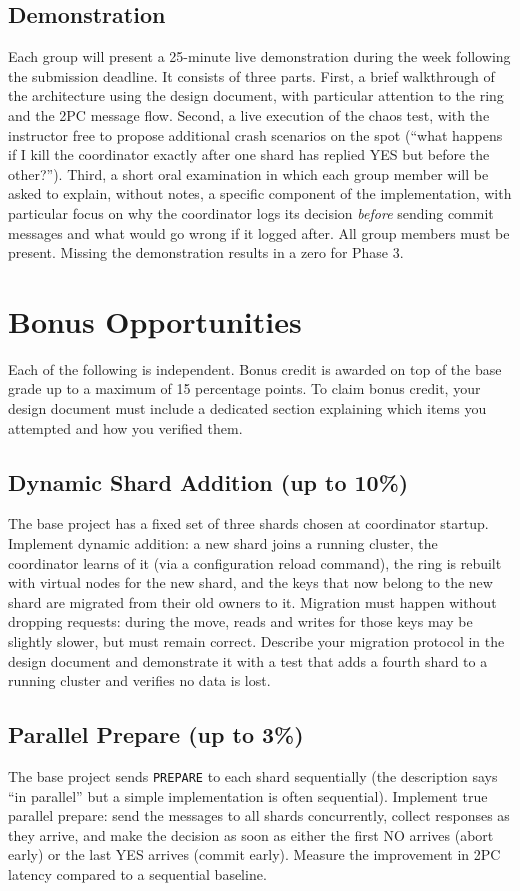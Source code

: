 \documentclass[11pt,a4paper]{article}
\begin{document}
\subsection{Demonstration}
Each group will present a 25-minute live demonstration during the week following the submission deadline. It consists of three parts. First, a brief walkthrough of the architecture using the design document, with particular attention to the ring and the 2PC message flow. Second, a live execution of the chaos test, with the instructor free to propose additional crash scenarios on the spot (``what happens if I kill the coordinator exactly after one shard has replied YES but before the other?''). Third, a short oral examination in which each group member will be asked to explain, without notes, a specific component of the implementation, with particular focus on why the coordinator logs its decision \textit{before} sending commit messages and what would go wrong if it logged after. All group members must be present. Missing the demonstration results in a zero for Phase 3.

\section{Bonus Opportunities}

Each of the following is independent. Bonus credit is awarded on top of the base grade up to a maximum of 15 percentage points. To claim bonus credit, your design document must include a dedicated section explaining which items you attempted and how you verified them.

\subsection{Dynamic Shard Addition (up to 10\%)}
The base project has a fixed set of three shards chosen at coordinator startup. Implement dynamic addition: a new shard joins a running cluster, the coordinator learns of it (via a configuration reload command), the ring is rebuilt with virtual nodes for the new shard, and the keys that now belong to the new shard are migrated from their old owners to it. Migration must happen without dropping requests: during the move, reads and writes for those keys may be slightly slower, but must remain correct. Describe your migration protocol in the design document and demonstrate it with a test that adds a fourth shard to a running cluster and verifies no data is lost.

\subsection{Parallel Prepare (up to 3\%)}
The base project sends \texttt{PREPARE} to each shard sequentially (the description says ``in parallel'' but a simple implementation is often sequential). Implement true parallel prepare: send the messages to all shards concurrently, collect responses as they arrive, and make the decision as soon as either the first NO arrives (abort early) or the last YES arrives (commit early). Measure the improvement in 2PC latency compared to a sequential baseline.
\end{document}
